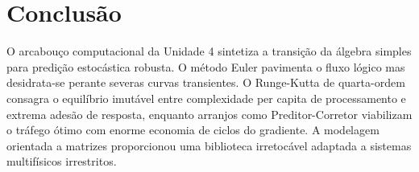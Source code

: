 \documentclass[12pt,a4paper]{article}
\begin{document}
\section{Conclusão}
O arcabouço computacional da Unidade 4 sintetiza a transição da álgebra simples para predição estocástica robusta. O método Euler pavimenta o fluxo lógico mas desidrata-se perante severas curvas transientes. O Runge-Kutta de quarta-ordem consagra o equilíbrio imutável entre complexidade per capita de processamento e extrema adesão de resposta, enquanto arranjos como Preditor-Corretor viabilizam o tráfego ótimo com enorme economia de ciclos do gradiente. A modelagem orientada a matrizes proporcionou uma biblioteca irretocável adaptada a sistemas multifísicos irrestritos.
\end{document}
